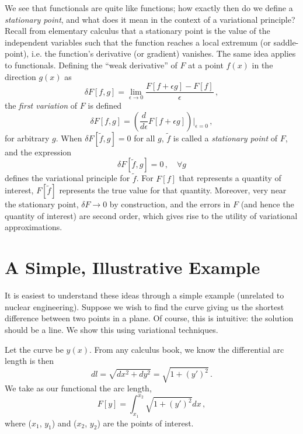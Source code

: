 We see that functionals are quite like functions; how exactly then do we 
define a \textit{stationary point}, and what does it mean in the context 
of a variational principle?  Recall from elementary calculus that a stationary 
point is the value of the independent variables such that the function reaches 
a local extremum (or saddle-point), i.e. the function's derivative (or 
gradient) vanishes.  The same idea applies to functionals.  Defining 
the ``weak derivative'' of $F$ at a point $f(x)$ in the direction $g(x)$ as
\begin{equation}
 \delta F[f,g] = \lim_{\epsilon \to 0} 
                 \frac{ F[f+\epsilon g] - F[f] }{\epsilon} \, ,
\end{equation}
the \textit{first variation} of $F$ is defined 
\begin{equation}
 \delta F[f,g] = \left ( \frac{d}{d\epsilon} F[f+\epsilon g] \right ) 
                 \Bigg |_{\epsilon = 0} \, ,
\end{equation}
for arbitrary $g$.  When $\delta F[\tilde{f},g] = 0$ for all $g$, $\tilde{f}$ 
is called a \textit{stationary point} of $F$, and the expression
\begin{equation}
 \delta F[\tilde{f},g] = 0 \, ,  \, \, \, \, \, \, \forall g 
\end{equation}
defines the variational principle for $\tilde{f}$.  For $F[f]$ that represents 
a quantity of interest, $F[\tilde{f}]$ represents the true value for that 
quantity.  Moreover, very near the stationary point, $\delta F \to 0$ by 
construction, and the errors in $F$ (and hence the quantity of interest) are 
second order, which gives rise to the utility of variational approximations.

\section*{A Simple, Illustrative Example}

It is easiest to understand these ideas through a simple example (unrelated 
to nuclear engineering).  Suppose we wish to find the curve giving us the 
shortest difference between two points in a plane.  Of course, this is 
intuitive: the solution should be a line.  We show this using variational 
techniques.  

Let the curve be $y(x)$. From any calculus book, we know the differential arc 
length is then
\begin{equation}
 dl = \sqrt{ dx^2 + dy^2 } = \sqrt{1 + (y')^2} \, .
\end{equation}
We take as our functional the arc length,
\begin{equation}
 F[y] = \int^{x_2}_{x_1} \sqrt{1 + (y')^2} dx \, ,
\end{equation}
where ($x_1$, $y_1$) and ($x_2$, $y_2$) are the points of interest.  

